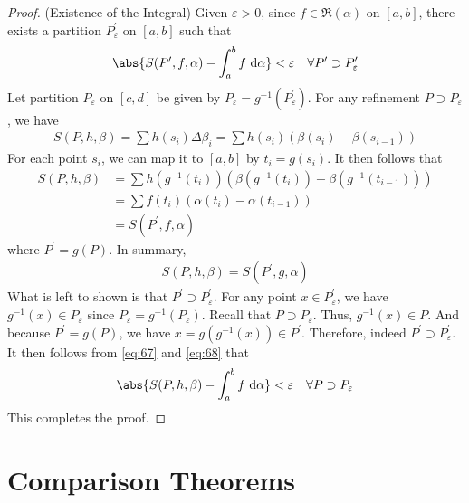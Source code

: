 \documentclass[thmcnt=section, 12pt]{elegantbook}
\begin{document}
\begin{proof}
    \par (Existence of the Integral) Given $\varepsilon > 0$, since $f \in \mathfrak{R}(\alpha)$ on $[a, b]$, there exists a partition $P^\prime_\varepsilon$ on $[a, b]$ such that 
    \begin{align}
        \abs{S(P^\prime, f, \alpha) - \int_a^b f \ \mathrm{d}\alpha} < \varepsilon
        \quad \forall P^\prime \supset P^\prime_\varepsilon
        \label{eq:67}
    \end{align}
    Let partition $P_\varepsilon$ on $[c, d]$ be given by $P_\varepsilon = g^{-1}(P^\prime_\varepsilon)$. For any refinement $P \supset P_\varepsilon$, we have 
    \begin{align*}
        S(P, h, \beta)
        = \sum h(s_i) \Delta\beta_i
        = \sum h(s_i) (\beta(s_i) - \beta(s_{i-1}))
    \end{align*}
    For each point $s_i$, we can map it to $[a, b]$ by $t_i = g(s_i)$. It then follows that 
    \begin{align*}
        S(P, h, \beta)
        &= \sum h(g^{-1}(t_i)) (\beta(g^{-1}(t_i)) - \beta(g^{-1}(t_{i-1}))) \\ 
        &= \sum f(t_i) (\alpha(t_i) - \alpha(t_{i-1})) \\ 
        &= S(P^\prime, f, \alpha)
    \end{align*}
    where $P^\prime = g(P)$. In summary,
    \begin{align}
        S(P, h, \beta) = S(P^\prime, g, \alpha)
        \label{eq:68}
    \end{align}
    What is left to shown is that $P^\prime \supset P^\prime_\varepsilon$. For any point $x \in P^\prime_\varepsilon$, we have $g^{-1}(x) \in P_\varepsilon$ since $P_\varepsilon = g^{-1}(P_\varepsilon)$. Recall that $P \supset P_\varepsilon$. Thus, $g^{-1}(x) \in P$. And because $P^\prime = g(P)$, we have $x = g(g^{-1}(x)) \in P^\prime$. Therefore, indeed $P^\prime \supset P^\prime_\varepsilon$. It then follows from \eqref{eq:67} and \eqref{eq:68} that 
    \begin{align*}
        \abs{S(P, h, \beta) - \int_a^b f \ \mathrm{d}\alpha} < \varepsilon
        \quad \forall P \supset P_\varepsilon
    \end{align*}
    This completes the proof.
\end{proof}


\section{Comparison Theorems}
\end{document}
